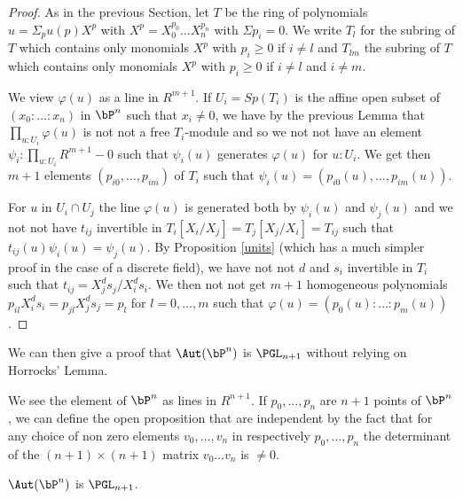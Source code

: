 \begin{proof}
  As in the previous Section, let $T$ be the ring of polynomials $u = \Sigma_p u(p)X^p$ with
$X^p = X_0^{p_0}\dots X_n^{p_n}$ with $\Sigma p_i = 0$. We write $T_l$ for the subring
of $T$ which contains only monomials $X^p$ with $p_i\geqslant 0$ if $i\neq l$
and $T_{lm}$ the subring of $T$ 
which contains only monomials $X^p$ with $p_i\geqslant 0$ if $i\neq l$ and $i\neq m$.

  We view $\varphi(u)$ as a line in $R^{m+1}$. 
  If $U_i = Sp(T_i)$ is the affine open subset of
  $(x_0:\dots:x_n)$ in $\bP^n$ such that $x_i\neq 0$, we have by the previous Lemma that
  $\prod_{u:U_i}\varphi(u)$ is not not a free $T_i$-module and so we not not have
  an element $\psi_i:\prod_{u:U_i}R^{m+1}-0$ such that $\psi_i(u)$ generates $\varphi(u)$ for $u:U_i$.
  We get then $m+1$ elements $(p_{i0},\dots,p_{im})$ of $T_i$ such that
  $\psi_i(u) = (p_{i0}(u),\dots,p_{im}(u))$.

  For $u$ in $U_i\cap U_j$ the line $\varphi(u)$ is generated both by $\psi_i(u)$ and $\psi_j(u)$
  and we not not have $t_{ij}$ invertible in $T_i[X_i/X_j] = T_j[X_j/X_i] = T_{ij}$ such that
  $t_{ij}(u)\psi_i(u) = \psi_j(u)$. By Proposition \ref{units} (which has a much simpler proof in the case
  of a discrete field), we have not not $d$ and $s_i$ invertible in $T_i$ such that
  $t_{ij} = X_j^d s_j/X_i^d s_i$.
  We then not not
  get $m+1$ homogeneous polynomials $p_{il}X_i^ds_i = p_{jl}X_j^d s_j = p_l$ for $l = 0,\dots,m$
  such that $\varphi(u) = (p_0(u):\dots:p_m(u))$.
\end{proof}

We can then give a proof that   $\Aut(\bP^n)$ is $\PGL_{n+1}$ without relying on Horrocks' Lemma.

We see the element of $\bP^n$ as lines in $R^{n+1}$.
If $p_0,\dots,p_n$ are $n+1$ points of $\bP^n$, we can define the open proposition that are independent
by the fact that for any choice of non zero elements $v_0,\dots,v_n$ in respectively $p_0,\dots,p_n$
the determinant of the $(n+1)\times (n+1)$ matrix $v_0\dots v_n$ is $\neq 0$.

\begin{corollary}
    $\Aut(\bP^n)$ is $\PGL_{n+1}$.
\end{corollary}

